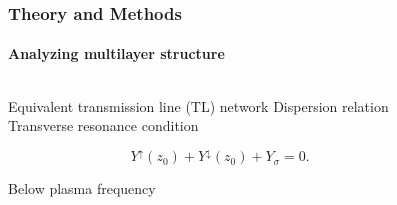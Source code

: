 \documentclass[mathserif,16pt,xcolor=table]{beamer}
\begin{document}
      \begin{frame}
        \frametitle{Theory and Methods}
        \framesubtitle{Analyzing multilayer structure}
        \begin{columns}[T] %
          \begin{column}{.45\textwidth}
            \begin{outline}[itemize]
              \1 Equivalent transmission line (TL) network
              \1 Dispersion relation
                \2 Transverse resonance condition
            \end{outline}
            \begin{equation} \nonumber
              Y^{\uparrow}(z_0) + Y^{\downarrow}(z_0) + Y_{\sigma} = 0.
              \label{eq:dispersion}
            \end{equation}
            \begin{outline}[itemize]
              \1 Below plasma frequency
              \end{outline}
          \end{column}
          \begin{column}[T]{.65\textwidth}
            \vspace*{-1cm} \hspace*{-2cm}
            \begin{figure}
              \centering \hspace*{-.5cm}
              \fontsize{6}{7}\selectfont
              \def\svgwidth{1.2\linewidth}
              
            \end{figure}
          \end{column}
        \end{columns}
      \end{frame}
\end{document}
